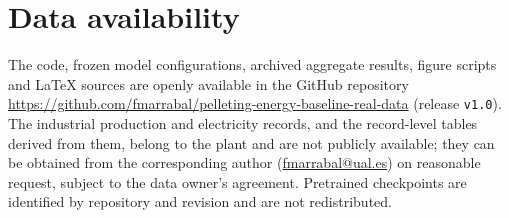 \section*{Data availability}
The code, frozen model configurations, archived aggregate results, figure scripts and LaTeX sources are openly available in the GitHub repository \url{https://github.com/fmarrabal/pelleting-energy-baseline-real-data} (release \texttt{v1.0}). The industrial production and electricity records, and the record-level tables derived from them, belong to the plant and are not publicly available; they can be obtained from the corresponding author (\href{mailto:fmarrabal@ual.es}{fmarrabal@ual.es}) on reasonable request, subject to the data owner's agreement. Pretrained checkpoints are identified by repository and revision and are not redistributed.
